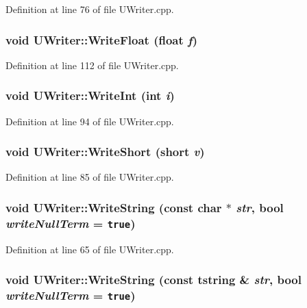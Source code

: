 Definition at line 76 of file UWriter.cpp.\hypertarget{class_u_writer_b70c7cb62e406390fb68ddbb22ad25e7}{
\subsubsection[{WriteFloat}]{\setlength{\rightskip}{0pt plus 5cm}void UWriter::WriteFloat (float {\em f})}}
\label{class_u_writer_b70c7cb62e406390fb68ddbb22ad25e7}




Definition at line 112 of file UWriter.cpp.\hypertarget{class_u_writer_2012d798142a97cacf03227395c2e24c}{
\subsubsection[{WriteInt}]{\setlength{\rightskip}{0pt plus 5cm}void UWriter::WriteInt (int {\em i})}}
\label{class_u_writer_2012d798142a97cacf03227395c2e24c}




Definition at line 94 of file UWriter.cpp.\hypertarget{class_u_writer_ad53e1a9063eec9545834eb288fe0767}{
\subsubsection[{WriteShort}]{\setlength{\rightskip}{0pt plus 5cm}void UWriter::WriteShort (short {\em v})}}
\label{class_u_writer_ad53e1a9063eec9545834eb288fe0767}




Definition at line 85 of file UWriter.cpp.\hypertarget{class_u_writer_753241171303a3cc3257e323846f2d3f}{
\subsubsection[{WriteString}]{\setlength{\rightskip}{0pt plus 5cm}void UWriter::WriteString (const char $\ast$ {\em str}, \/  bool {\em writeNullTerm} = {\tt true})}}
\label{class_u_writer_753241171303a3cc3257e323846f2d3f}




Definition at line 65 of file UWriter.cpp.\hypertarget{class_u_writer_bbe55ee0c4a3b202b365da202899d410}{
\subsubsection[{WriteString}]{\setlength{\rightskip}{0pt plus 5cm}void UWriter::WriteString (const {\bf tstring} \& {\em str}, \/  bool {\em writeNullTerm} = {\tt true})}}
\label{class_u_writer_bbe55ee0c4a3b202b365da202899d410}




